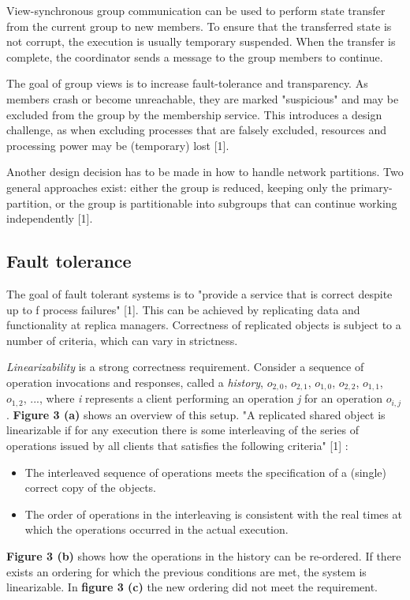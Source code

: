 View-synchronous group communication can be used to perform state transfer from the current group to new members. To ensure that the transferred state is not corrupt, the execution is usually temporary suspended. When the transfer is complete, the coordinator sends a message to the group members to continue.

The goal of group views is to increase fault-tolerance and transparency. As members crash or become unreachable, they are marked "suspicious" and may be excluded from the group by the membership service. This introduces a design challenge, as when excluding processes that are falsely excluded, resources and processing power may be (temporary) lost [1].

Another design decision has to be made in how to handle network partitions. Two general approaches exist: either the group is reduced, keeping only the primary-partition, or the group is partitionable into subgroups that can continue working independently [1].



\subsection{Fault tolerance}

The goal of fault tolerant systems is to "provide a service that is correct despite up to f process failures" [1]. This can be achieved by replicating data and functionality at replica managers. Correctness of replicated objects is subject to a number of criteria, which can vary in strictness.

\emph{Linearizability} is a strong correctness requirement. Consider a sequence of operation invocations and responses, called a \emph{history}, $o_{2,0}$, $o_{2,1}$, $o_{1,0}$, $o_{2,2}$, $o_{1,1}$, $o_{1,2}$, ..., where \emph{i} represents a client performing an operation \emph{j} for an operation $o_{i,j}$. \textbf{Figure 3 (a)} shows an overview of this setup. "A replicated shared object is linearizable if for any execution there is some interleaving of the series of operations issued by all clients that satisfies the following criteria" [1] :
\begin{itemize}
	\item The interleaved sequence of operations meets the specification of a (single) correct copy of the objects.
	\item The order of operations in the interleaving is consistent with the real times at which the operations occurred in the actual execution.
\end{itemize}
\textbf{Figure 3 (b)} shows how the operations in the history can be re-ordered. If there exists an ordering for which the previous conditions are met, the system is linearizable. In \textbf{figure 3 (c)} the new ordering did not meet the requirement.


